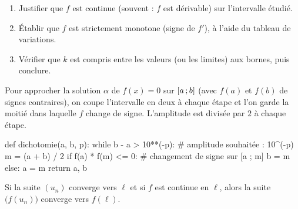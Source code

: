 \begin{savoirfaire}[Montrer qu'une équation $f(x)=k$ a une unique solution]
\begin{enumerate}[label=\otLabel{\arabic*.},leftmargin=1.6em,itemsep=0.6mm,topsep=0.5mm]
  \item Justifier que $f$ est continue (souvent : $f$ est dérivable) sur l'intervalle étudié.
  \item Établir que $f$ est strictement monotone (signe de $f'$), à l'aide du tableau de variations.
  \item Vérifier que $k$ est compris entre les valeurs (ou les limites) aux bornes, puis conclure.
\end{enumerate}
\end{savoirfaire}


\noindent
\begin{minipage}[c]{0.5\linewidth}
Pour approcher la solution $\alpha$ de $f(x)=0$ sur $\mathopen{[}a\,{;}\,b\mathclose{]}$ (avec $f(a)$ et $f(b)$ de signes contraires), on coupe
l'intervalle en deux à chaque étape et l'on garde la moitié dans laquelle $f$ change de signe. L'amplitude est divisée
par $2$ à chaque étape.
\end{minipage}\hfill
\begin{minipage}[c]{0.45\linewidth}
\centering
{}
\end{minipage}

\begin{python}
def dichotomie(a, b, p):
    while b - a > 10**(-p):       # amplitude souhaitée : 10^(-p)
        m = (a + b) / 2
        if f(a) * f(m) <= 0:      # changement de signe sur [a ; m]
            b = m
        else:
            a = m
    return a, b
\end{python}


\begin{theoreme}
Si la suite $(u_n)$ converge vers $\ell$ et si $f$ est continue en $\ell$, alors la suite $\big(f(u_n)\big)$ converge vers $f(\ell)$.
\end{theoreme}

